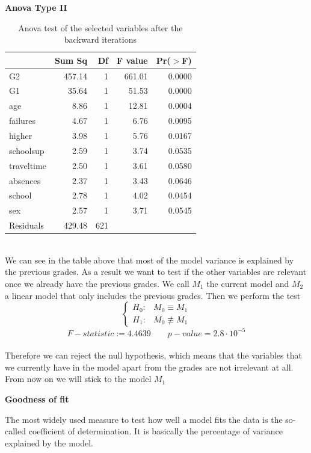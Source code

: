 \documentclass[a4paper, 11pt]{report}
\theoremstyle{definition}
\numberwithin{equation}{section}		%
\numberwithin{table}{section}				%
\begin{document}
\begin{table}[ht]
\centering
\textbf{Anova Type II}\par\medskip
\begin{tabular}{lrrrr}
  \hline
 & Sum Sq & Df & F value & Pr($>$F) \\ 
   \hline
G2 & 457.14 & 1 & 661.01 & 0.0000 \\ 
  G1 & 35.64 & 1 & 51.53 & 0.0000 \\ 
  age & 8.86 & 1 & 12.81 & 0.0004 \\ 
  failures & 4.67 & 1 & 6.76 & 0.0095 \\ 
  higher & 3.98 & 1 & 5.76 & 0.0167 \\ 
  schoolsup & 2.59 & 1 & 3.74 & 0.0535 \\ 
  traveltime & 2.50 & 1 & 3.61 & 0.0580 \\ 
  absences & 2.37 & 1 & 3.43 & 0.0646 \\ 
  school & 2.78 & 1 & 4.02 & 0.0454 \\ 
  sex & 2.57 & 1 & 3.71 & 0.0545 \\ 
  Residuals & 429.48 & 621 &  &  \\ 
   \hline
\end{tabular}
\caption{Anova test of the selected variables after the backward iterations}
\end{table}\\[0.1in]
We can see in the table above that most of the model variance is explained by the previous grades. As a result we want to test if the other variables are relevant once we already have the previous grades. We call $M_1$ the current model and $M_2$ a linear model that only includes the previous grades. Then we perform the test
\begin{equation}
    \begin{cases}
      H_0:  & M_0 \equiv M_1 \\
      H_1:  & M_0 \not\equiv M_1
    \end{cases}
  \end{equation}
    \bigskip
$$\boxed{F-statistic := 4.4639 \quad \quad  p-value =  2.8\cdot 10^{-5}}$$
\\[0.2in]
Therefore we can reject the null hypothesis, which means that the variables that we currently have in the model apart from the grades are not irrelevant at all. From now on we will stick to the model $M_1$
\begin{center}\textbf{Goodness of fit}\end{center}\bigskip
The most widely used measure to test how well a model fits the data is the so-called coefficient of determination. It is basically the percentage of variance explained by the model.
\end{document}
